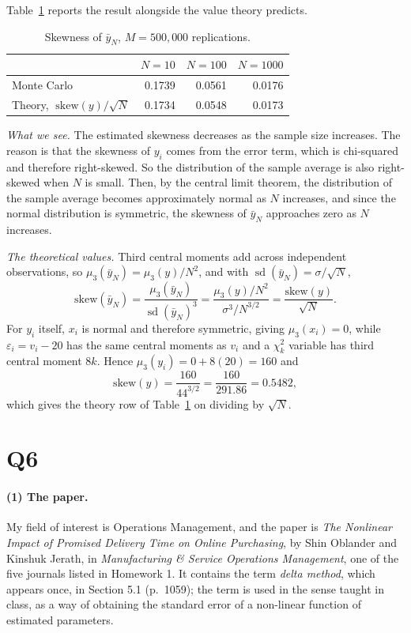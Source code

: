 \documentclass[11pt]{article}
\DeclareMathOperator{\sd}{sd}
\begin{document}
Table~\ref{tab:q5-skew} reports the result alongside the value theory predicts.

\begin{table}[htbp]
\centering
\caption{Skewness of $\bar{y}_N$, $M = 500{,}000$ replications.}
\label{tab:q5-skew}
\small
\begin{tabular}{lrrr}
\toprule
& $N = 10$ & $N = 100$ & $N = 1000$ \\
\midrule
Monte Carlo & 0.1739 & 0.0561 & 0.0176 \\
Theory, $\;\text{skew}(y)/\sqrt{N}$ & 0.1734 & 0.0548 & 0.0173 \\
\bottomrule
\end{tabular}
\end{table}

\emph{What we see.} The estimated skewness decreases as the sample size
increases. The reason is that the skewness of $y_i$ comes from the error term,
which is chi-squared and therefore right-skewed. So the distribution of the
sample average is also right-skewed when $N$ is small. Then, by the central
limit theorem, the distribution of the sample average becomes approximately
normal as $N$ increases, and since the normal distribution is symmetric, the
skewness of $\bar{y}_N$ approaches zero as $N$ increases.

\emph{The theoretical values.} Third central moments add across independent
observations, so $\mu_3(\bar{y}_N) = \mu_3(y)/N^2$, and with
$\sd(\bar{y}_N) = \sigma/\sqrt{N}$,
\[
\text{skew}(\bar{y}_N)
= \frac{\mu_3(\bar{y}_N)}{\sd(\bar{y}_N)^3}
= \frac{\mu_3(y)/N^2}{\sigma^3/N^{3/2}}
= \frac{\text{skew}(y)}{\sqrt{N}} .
\]
For $y_i$ itself, $x_i$ is normal and therefore symmetric, giving
$\mu_3(x_i) = 0$, while $\varepsilon_i = v_i - 20$ has the same central moments
as $v_i$ and a $\chi^2_k$ variable has third central moment $8k$. Hence
$\mu_3(y_i) = 0 + 8(20) = 160$ and
\[
\text{skew}(y) = \frac{160}{44^{3/2}} = \frac{160}{291.86} = 0.5482,
\]
which gives the theory row of Table~\ref{tab:q5-skew} on dividing by
$\sqrt{N}$.

\section{Q6}
\label{sec:q6}

\paragraph{(1) The paper.}
My field of interest is Operations Management, and the paper is \emph{The
Nonlinear Impact of Promised Delivery Time on Online Purchasing}, by Shin
Oblander and Kinshuk Jerath, in \emph{Manufacturing \& Service Operations
Management}, one of the five journals listed in Homework 1. It contains the
term \emph{delta method}, which appears once, in Section 5.1 (p.~1059); the
term is used in the sense taught in class, as a way of obtaining the standard
error of a non-linear function of estimated parameters.
\end{document}
